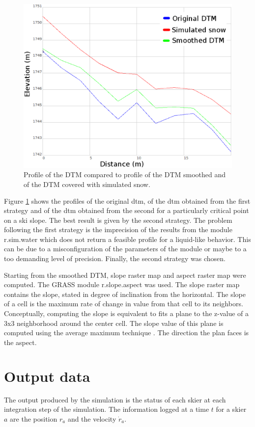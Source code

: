 \documentclass[12pt,a4paper,twoside]{book}
\begin{document}
\begin{figure}[!h]
  \centering
    \includegraphics[width=\textwidth]{images/profiles_dtm.eps}
    \caption{Profile of the DTM compared to profile of the DTM smoothed and of the DTM covered with simulated snow.}\label{profile_dtm}
\end{figure}

Figure \ref{profile_dtm} shows the profiles of the original dtm, of the dtm obtained from the first strategy and of the dtm obtained from the second for a particularly critical point on a ski slope. The best result is given by the second strategy. The problem following the first strategy is the imprecision of the results from the module r.sim.water which does not return a feasible profile for a liquid-like behavior. This can be due to a misconfiguration of the parameters of the module or maybe to a too demanding level of precision. Finally, the second strategy was chosen.

Starting from the smoothed DTM, slope raster map and aspect raster map were computed. The GRASS module r.slope.aspect was used. The slope raster map contains the slope, stated in degree of inclination from the horizontal. The slope of a cell is the maximum rate of change in value from that cell to its neighbors. Conceptually, computing the slope is equivalent to fits a plane to the z-value of a 3x3 neighborhood around the center cell. The slope value of this plane is computed using the average maximum technique \cite{bur2009}. The direction the plan faces is the aspect.

\section{Output data}\label{output_data}
The output produced by the simulation is the status of each skier at each integration step of the simulation. The information logged at a time $t$ for a skier $a$ are the position $r_a$ and the velocity $\dot{r}_a$.
\end{document}
